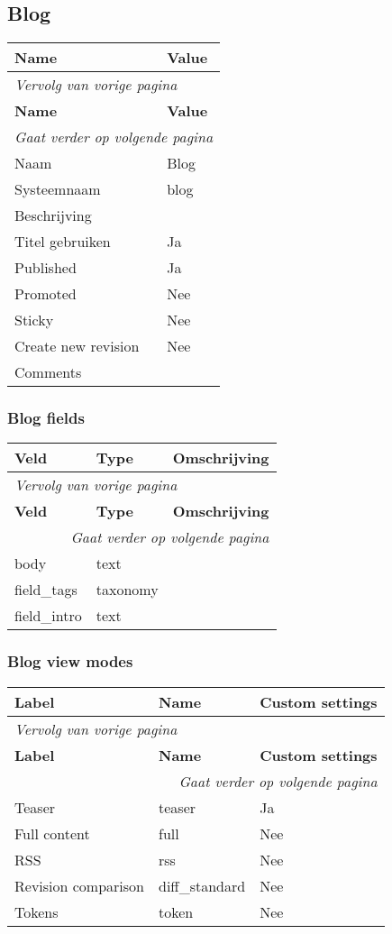 \subsection{Blog}
\label{sec:content-blog}
  \begin{longtable}{| p{7.50cm}|p{7.50cm}|}
  \hline
  \rowcolor{tableheader}
  \textbf{Name} & \textbf{Value}  \tabularnewline
  \hline
\endfirsthead
\multicolumn{2}{l}{\textit{Vervolg van vorige pagina}} \\
\hline
\rowcolor{tableheader}
  \textbf{Name} & \textbf{Value}  \tabularnewline
  \hline
\hline
\endhead
\multicolumn{2}{r}{\textit{Gaat verder op volgende pagina}} \\
\endfoot
\hline
\endlastfoot
  Naam & Blog  \tabularnewline
  \hline
  Systeemnaam & blog  \tabularnewline
  \hline
  Beschrijving &   \tabularnewline
  \hline
  Titel gebruiken & Ja  \tabularnewline
  \hline
  Published & Ja  \tabularnewline
  \hline
  Promoted & Nee  \tabularnewline
  \hline
  Sticky & Nee  \tabularnewline
  \hline
  Create new revision & Nee  \tabularnewline
  \hline
  Comments &   \tabularnewline
  \hline
  \end{longtable}

\subsubsection{Blog fields}
  \begin{longtable}{| p{5.00cm}|p{5.00cm}|p{5.00cm}|}
  \hline
  \rowcolor{tableheader}
  \textbf{Veld} & \textbf{Type} & \textbf{Omschrijving}  \tabularnewline
  \hline
\endfirsthead
\multicolumn{3}{l}{\textit{Vervolg van vorige pagina}} \\
\hline
\rowcolor{tableheader}
  \textbf{Veld} & \textbf{Type} & \textbf{Omschrijving}  \tabularnewline
  \hline
\hline
\endhead
\multicolumn{3}{r}{\textit{Gaat verder op volgende pagina}} \\
\endfoot
\hline
\endlastfoot
  body & text &   \tabularnewline
  \hline
  field\_tags & taxonomy &   \tabularnewline
  \hline
  field\_intro & text &   \tabularnewline
  \hline
  \end{longtable}

\subsubsection{Blog view modes}
  \begin{longtable}{| p{5.00cm}|p{5.00cm}|p{5.00cm}|}
  \hline
  \rowcolor{tableheader}
  \textbf{Label} & \textbf{Name} & \textbf{Custom settings}  \tabularnewline
  \hline
\endfirsthead
\multicolumn{3}{l}{\textit{Vervolg van vorige pagina}} \\
\hline
\rowcolor{tableheader}
  \textbf{Label} & \textbf{Name} & \textbf{Custom settings}  \tabularnewline
  \hline
\hline
\endhead
\multicolumn{3}{r}{\textit{Gaat verder op volgende pagina}} \\
\endfoot
\hline
\endlastfoot
  Teaser & teaser & Ja  \tabularnewline
  \hline
  Full content & full & Nee  \tabularnewline
  \hline
  RSS & rss & Nee  \tabularnewline
  \hline
  Revision comparison & diff\_standard & Nee  \tabularnewline
  \hline
  Tokens & token & Nee  \tabularnewline
  \hline
  \end{longtable}

